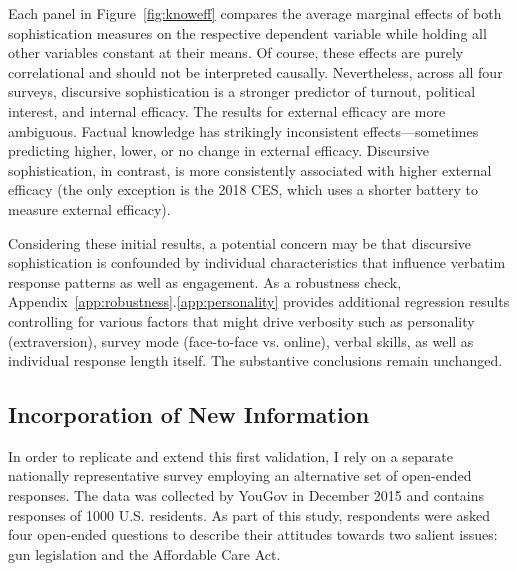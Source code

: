 Each panel in Figure~\ref{fig:knoweff} compares the average marginal effects of both sophistication measures on the respective dependent variable while holding all other variables constant at their means. Of course, these effects are purely correlational and should not be interpreted causally. Nevertheless, across all four surveys, discursive sophistication is a stronger predictor of turnout, political interest, and internal efficacy. The results for external efficacy are more ambiguous. Factual knowledge has strikingly inconsistent effects---sometimes predicting higher, lower, or no change in external efficacy. Discursive sophistication, in contrast, is more consistently associated with higher external efficacy (the only exception is the 2018 CES, which uses a shorter battery to measure external efficacy).


Considering these initial results, a potential concern may be that discursive sophistication is confounded by individual characteristics that influence verbatim response patterns as well as engagement. As a robustness check, Appendix~\ref{app:robustness}.\ref{app:personality} provides additional regression results controlling for various factors that might drive verbosity such as personality (extraversion), survey mode (face-to-face vs. online), verbal skills, as well as individual response length itself. The substantive conclusions remain unchanged.


\subsection*{Incorporation of New Information}
In order to replicate and extend this first validation, I rely on a separate nationally representative survey employing an alternative set of open-ended responses. The data was collected by YouGov in December 2015 and contains responses of 1000 U.S. residents. %
As part of this study, respondents were asked four open-ended questions to describe their attitudes towards two salient issues: gun legislation and the Affordable Care Act.


